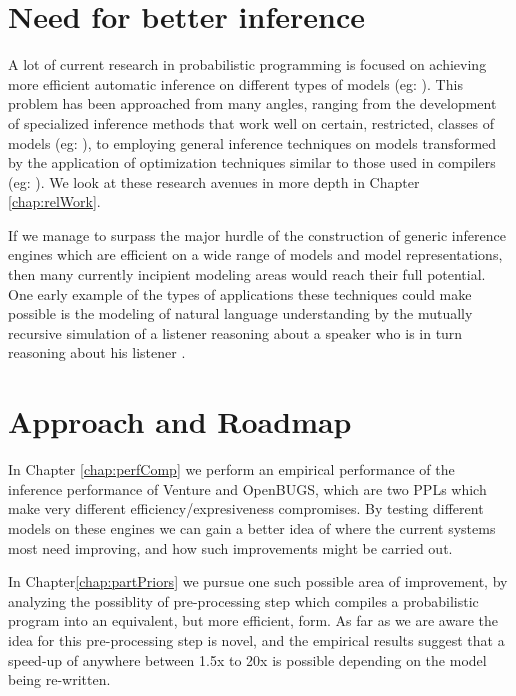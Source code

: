 \section{Need for better inference}
A lot of current research in probabilistic programming is focused on achieving more efficient automatic inference on different types of models (eg: \cite{goodman2013principles, wingate2011nonstandard, wood2014new}). This problem has been approached from many angles, ranging from the development of specialized inference methods that work well on certain, restricted, classes of models (eg: \cite{stuhlmuller2012dynamic, yeh2012synthesizing}), to employing general inference techniques on models transformed by the application of optimization techniques similar to those used in compilers (eg: \cite{mansinghka2014venture, yang2013incrementalizing}). We look at these research avenues in more depth in Chapter \ref{chap:relWork}.

If we manage to surpass the major hurdle of the construction of generic inference engines which are efficient on a wide range of models and model representations, then many currently incipient modeling areas would reach their full potential. One early example of the types of applications these techniques could make possible is the modeling of natural language understanding by the mutually recursive simulation of a listener reasoning about a speaker who is in turn reasoning about his listener \cite{goodman2013knowledge, frank2012predicting}. 

\section{Approach and Roadmap}
In Chapter \ref{chap:perfComp} we perform an empirical performance of the inference performance of Venture and OpenBUGS, which are two PPLs which make very different efficiency/expresiveness compromises. By testing different models on these engines we can gain a better idea of where the current systems most need improving, and how such improvements might be carried out. 

In Chapter\ref{chap:partPriors} we pursue one such possible area of improvement, by analyzing the possiblity of pre-processing step which compiles a probabilistic program into an equivalent, but more efficient, form. As far as we are aware the idea for this pre-processing step is novel, and the empirical results suggest that a speed-up of anywhere between 1.5x to 20x is possible depending on the model being re-written. 

